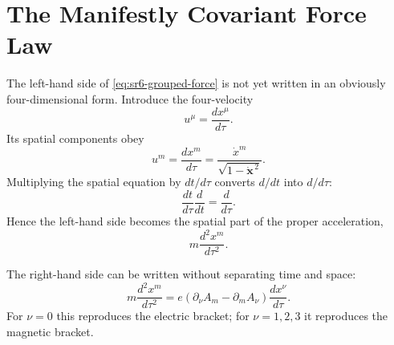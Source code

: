 \begin{classroomqa}
\end{classroomqa}

\begin{classroomqa}
\end{classroomqa}

\section{The Manifestly Covariant Force Law}

The left-hand side of \eqref{eq:sr6-grouped-force} is not yet written in an
obviously four-dimensional form.  Introduce the four-velocity
\begin{equation}
u^\mu=\frac{dx^\mu}{d\tau}.
\label{eq:sr6-four-velocity}
\end{equation}
Its spatial components obey
\begin{equation}
u^m
=
\frac{dx^m}{d\tau}
=
\frac{\dot x^m}{\sqrt{1-\dot{\mathbf x}^{\,2}}}.
\end{equation}
Multiplying the spatial equation by \(dt/d\tau\) converts
\(d/dt\) into \(d/d\tau\):
\begin{equation}
\frac{dt}{d\tau}\frac{d}{dt}
=
\frac{d}{d\tau}.
\end{equation}
Hence the left-hand side becomes the spatial part of the proper
acceleration,
\begin{equation}
m\frac{d^2x^m}{d\tau^2}.
\end{equation}

The right-hand side can be written without separating time and space:
\begin{equation}
m\frac{d^2x^m}{d\tau^2}
=
e\left(\partial_\nu A_m-\partial_mA_\nu\right)
\frac{dx^\nu}{d\tau}.
\label{eq:sr6-spatial-covariant-force}
\end{equation}
For \(\nu=0\) this reproduces the electric bracket; for
\(\nu=1,2,3\) it reproduces the magnetic bracket.

